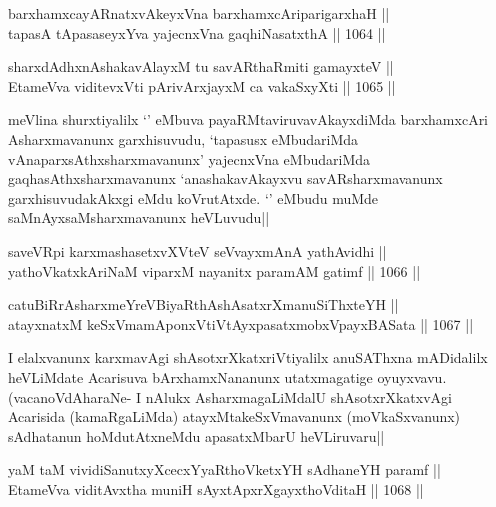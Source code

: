 
\begin{shl}
barxhamxcayARnatxvAkeyxVna barxhamxcAriparigarxhaH || \\
tapasA tApasaseyxYva yajecnxVna gaqhiNasatxthA ||  1064 ||  
\end{shl}
				
\begin{shl}
sharxdAdhxnAshakavAlayxM tu savARthaRmiti gamayxteV ||  \\
EtameVva viditevxVti pArivArxjayxM ca vakaSxyXti ||  1065 ||  
\end{shl}

\begin{artha}
meVlina shurxtiyalilx `\stext' eMbuva payaRMtaviruvavAkayxdiMda barxhamxcAri Asharxmavanunx garxhisuvudu, `tapasusx eMbudariMda vAnaparxsAthxsharxmavanunx' yajecnxVna eMbudariMda gaqhasAthxsharxmavanunx `anashakavAkayxvu savARsharxmavanunx garxhisuvudakAkxgi eMdu koVrutAtxde. `\stext' eMbudu muMde saMnAyxsaMsharxmavanunx heVLuvudu||
\end{artha}


\begin{shl}
saveVR\s pi karxmashasetxvXVteV seVvayxmAnA yathAvidhi || \\
yathoVkatxkAriNaM viparxM nayanitx paramAM gatimf ||  1066 ||  
\end{shl}
				
\begin{shl}
catuBiRrAsharxmeYreVBiyaRthAshAsatxrXmanuSiThxteYH || \\
atayxnatxM keSxVmamAponxVtiVtAyxpasatxmobxV\s payxBASata ||  1067 ||  
\end{shl}

\begin{artha}
I elalxvanunx karxmavAgi shAsotxrXkatxriVtiyalilx anuSAThxna mADidalilx heVLiMdate Acarisuva bArxhamxNananunx utatxmagatige oyuyxvavu. (vacanoVdAharaNe- I nAlukx AsharxmagaLiMdalU shAsotxrXkatxvAgi Acarisida (kamaRgaLiMda) atayxMtakeSxVmavanunx (moVkaSxvanunx) sAdhatanun hoMdutAtxneMdu apasatxMbarU heVLiruvaru||
\end{artha}


\begin{shl}
yaM taM vividiSanutxyXcecxYyaRthoVketxYH sAdhaneYH paramf || \\
EtameVva viditAvx\s tha muniH sAyxtApxrXgayxthoVditaH ||  1068 || 
\end{shl}

